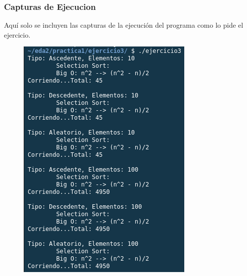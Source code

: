 \documentclass{article}
\begin{document}
			\subsubsection{Capturas de Ejecucion}
			
			Aquí solo se incluyen las capturas de la ejecución del programa como lo pide el ejercicio.
			
			\begin{figure}[H]
				\begin{multicols}{2}
					\includegraphics[width = \linewidth]{images/e3-1}\par

\end{multicols}
\end{figure}
\end{document}
